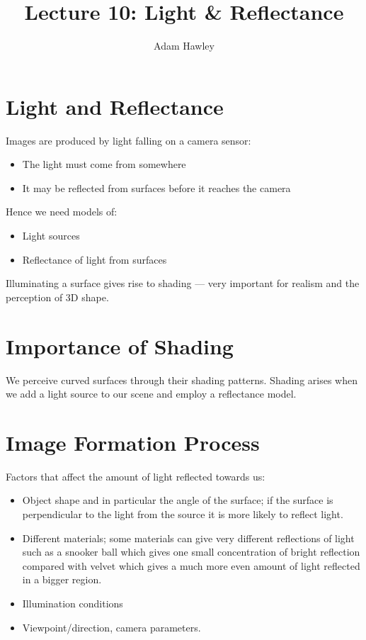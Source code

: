 \documentclass{article}
\title{Lecture 10: Light \& Reflectance}
\author{Adam Hawley}
\begin{document}
\maketitle

\tableofcontents
\newpage

\section{Light and Reflectance}
Images are produced by light falling on a camera sensor:
\begin{itemize}
	\item The light must come from somewhere
	\item It may be reflected from surfaces before it reaches the camera
\end{itemize}

Hence we need models of:
\begin{itemize}
	\item Light sources
	\item Reflectance of light from surfaces
\end{itemize}

Illuminating a surface gives rise to shading --- very important for realism and the perception of 3D shape.

\section{Importance of Shading}

We perceive curved surfaces through their shading patterns.
Shading arises when we add a light source to our scene and employ a reflectance model.

\section{Image Formation Process}
Factors that affect the amount of light reflected towards us:
\begin{itemize}
	\item Object shape and in particular the angle of the surface; if the surface is perpendicular to the light from the source it is more likely to reflect light.
	\item Different materials; some materials can give very different reflections of light such as a snooker ball which gives one small concentration of bright reflection compared with velvet which gives a much more even amount of light reflected in a bigger region.
	\item Illumination conditions
	\item Viewpoint/direction, camera parameters.
\end{itemize}
\end{document}
